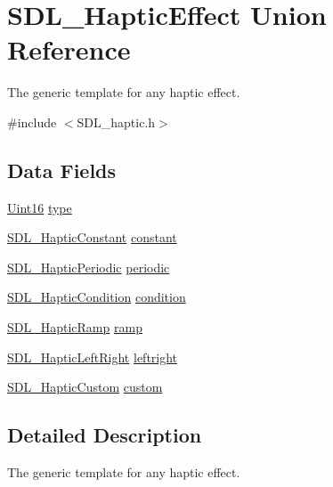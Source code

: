 \hypertarget{union_s_d_l___haptic_effect}{}\section{S\+D\+L\+\_\+\+Haptic\+Effect Union Reference}
\label{union_s_d_l___haptic_effect}


The generic template for any haptic effect.  




{\ttfamily \#include $<$S\+D\+L\+\_\+haptic.\+h$>$}

\subsection*{Data Fields}
\begin{DoxyCompactItemize}
\item 
\hyperlink{_s_d_l__stdinc_8h_a31fcc0a076c9068668173ee26d33e42b}{Uint16} \hyperlink{union_s_d_l___haptic_effect_a8db4a3e9f29940892f2773bca31c74e1}{type}
\item 
\hyperlink{struct_s_d_l___haptic_constant}{S\+D\+L\+\_\+\+Haptic\+Constant} \hyperlink{union_s_d_l___haptic_effect_ad87e37f1a81c2ae7f4d6f4adb91ccbb3}{constant}
\item 
\hyperlink{struct_s_d_l___haptic_periodic}{S\+D\+L\+\_\+\+Haptic\+Periodic} \hyperlink{union_s_d_l___haptic_effect_a884ed8463cf22d8ea337a2b0f67e2d5d}{periodic}
\item 
\hyperlink{struct_s_d_l___haptic_condition}{S\+D\+L\+\_\+\+Haptic\+Condition} \hyperlink{union_s_d_l___haptic_effect_af8fd644eaf678d5400af856cba7d235b}{condition}
\item 
\hyperlink{struct_s_d_l___haptic_ramp}{S\+D\+L\+\_\+\+Haptic\+Ramp} \hyperlink{union_s_d_l___haptic_effect_a7292694427f98b535d05484ee7b3ca45}{ramp}
\item 
\hyperlink{struct_s_d_l___haptic_left_right}{S\+D\+L\+\_\+\+Haptic\+Left\+Right} \hyperlink{union_s_d_l___haptic_effect_a90d9294f9978f6f71d57e7b4a89bee7f}{leftright}
\item 
\hyperlink{struct_s_d_l___haptic_custom}{S\+D\+L\+\_\+\+Haptic\+Custom} \hyperlink{union_s_d_l___haptic_effect_a0f40180fec16fe524abd712def126ca1}{custom}
\end{DoxyCompactItemize}


\subsection{Detailed Description}
The generic template for any haptic effect. 

